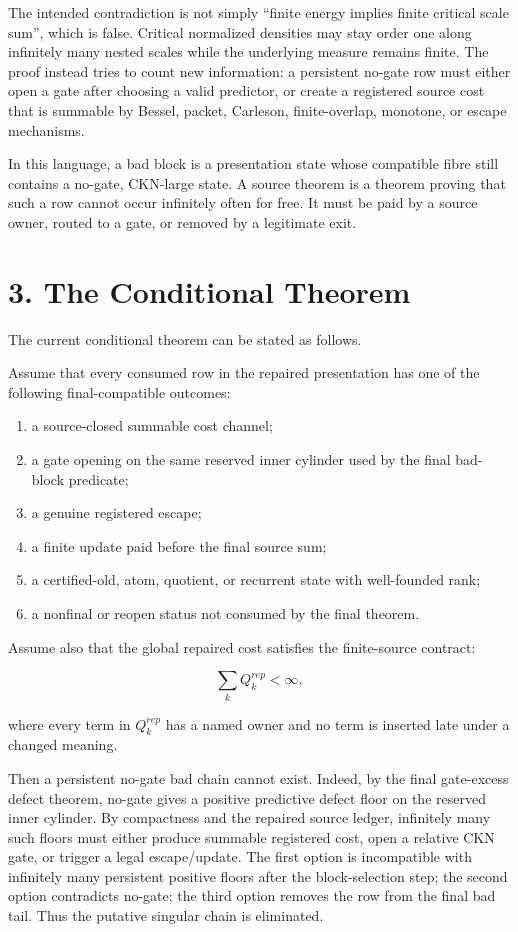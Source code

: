 \documentclass[11pt]{article}
\begin{document}
The intended contradiction is not simply ``finite energy implies finite critical scale sum'', which is false. Critical normalized densities may stay order one along infinitely many nested scales while the underlying measure remains finite. The proof instead tries to count new information: a persistent no-gate row must either open a gate after choosing a valid predictor, or create a registered source cost that is summable by Bessel, packet, Carleson, finite-overlap, monotone, or escape mechanisms.

In this language, a bad block is a presentation state whose compatible fibre still contains a no-gate, CKN-large state. A source theorem is a theorem proving that such a row cannot occur infinitely often for free. It must be paid by a source owner, routed to a gate, or removed by a legitimate exit.

\section*{3. The Conditional Theorem}

The current conditional theorem can be stated as follows.

Assume that every consumed row in the repaired presentation has one of the following final-compatible outcomes:

\begin{enumerate}
\item
  a source-closed summable cost channel;
\item
  a gate opening on the same reserved inner cylinder used by the final bad-block predicate;
\item
  a genuine registered escape;
\item
  a finite update paid before the final source sum;
\item
  a certified-old, atom, quotient, or recurrent state with well-founded rank;
\item
  a nonfinal or reopen status not consumed by the final theorem.
\end{enumerate}

Assume also that the global repaired cost satisfies the finite-source contract:

\[\sum_k Q_k^{rep}<\infty,\]

where every term in \(Q_k^{rep}\) has a named owner and no term is inserted late under a changed meaning.

Then a persistent no-gate bad chain cannot exist. Indeed, by the final gate-excess defect theorem, no-gate gives a positive predictive defect floor on the reserved inner cylinder. By compactness and the repaired source ledger, infinitely many such floors must either produce summable registered cost, open a relative CKN gate, or trigger a legal escape/update. The first option is incompatible with infinitely many persistent positive floors after the block-selection step; the second option contradicts no-gate; the third option removes the row from the final bad tail. Thus the putative singular chain is eliminated.
\end{document}
